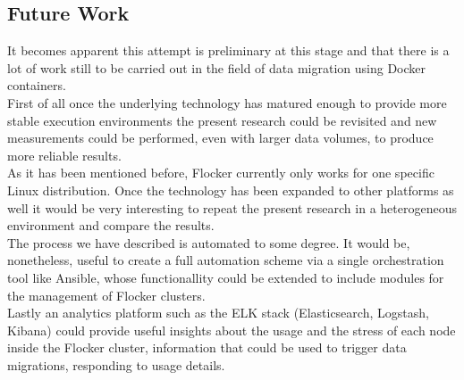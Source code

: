 \documentclass{article}
\begin{document}
\subsection{Future Work}
It becomes apparent this attempt is preliminary at this stage and that there is a lot of work still to be carried out in the field of data migration using Docker containers.\\
First of all once the underlying technology has matured enough to provide more stable execution environments the present research could be revisited and new measurements could be performed, even with larger data volumes, to produce more reliable results.\\
As it has been mentioned before, Flocker currently only works for one specific Linux distribution. Once the technology has been expanded to other platforms as well it would be very interesting to repeat the present research in a heterogeneous environment and compare the results.\\
The process we have described is automated to some degree. It would be, nonetheless, useful to create a full automation scheme via a single orchestration tool like Ansible, whose functionallity could be extended to include modules for the management of Flocker clusters.\\
Lastly an analytics platform such as the ELK stack (Elasticsearch, Logstash, Kibana)\cite{elk} could provide useful insights about the usage and the stress of each node inside the Flocker cluster, information that could be used to trigger data migrations, responding to usage details.
\end{document}
